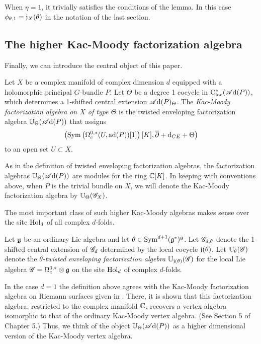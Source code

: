 When $\eta = 1$, it trivially satisfies the conditions of the lemma. 
In this case $\phi_{\theta, 1} = \mathfrak j_X(\theta)$ in the notation of the last section. 


\subsection{The higher Kac-Moody factorization algebra}

Finally, we can introduce the central object of this paper.

\begin{dfn}
Let $X$ be a complex manifold of complex dimension $d$ equipped with a holomorphic principal $G$-bundle $P$.
Let $\Theta$ be a degree 1 cocycle in ${\rm C}_{\rm loc}^*(\mathscr A{\rm d}(P))$, 
which determines a 1-shifted central extension $\mathscr A{\rm d}(P)_\Theta$.
The {\em Kac-Moody factorization algebra on $X$ of type $\Theta$} is the twisted enveloping factorization algebra $\mathbb U_\Theta (\mathscr A{\rm d}(P))$ that assigns
\[
\left({\rm Sym}\left(\Omega^{0,*}_c(U, {\rm ad}(P))[1]\right) [K] , \overline{\partial} + {\rm d}_{CE} + \Theta\right) 
\]
to an open set $U \subset X$.
\end{dfn}

\begin{rmk} 
As in the definition of twisted enveloping factorization algebras, the factorization algebras $\mathbb U_\Theta(\mathscr A{\rm d}(P))$ are modules for the ring $\mathbb C[K]$. 
In keeping with conventions above, when $P$ is the trivial bundle on $X$, 
we will denote the Kac-Moody factorization algebra by $\mathbb U_\Theta(\mathscr G_X)$. 
\end{rmk}

The most important class of such higher Kac-Moody algebras makes sense over the site ${\rm Hol}_d$ of all complex $d$-folds.

\begin{dfn}
Let $\mathfrak g$ be an ordinary Lie algebra and let $\theta \in {\rm Sym}^{d+1}(\mathfrak g^*)^\mathfrak g$.  
Let $\mathscr G_{d,\theta}$ denote the 1-shifted central extension of $\mathscr G_d$ determined by the local cocycle $\mathfrak j(\theta)$.
Let $\mathbb U_\theta (\mathscr G)$ denote the {\em $\theta$-twisted enveloping factorization algebra} $\mathbb U_{\mathfrak j(\theta)} (\mathscr G)$ for the local Lie algebra $\mathscr G = \Omega^{0,*}_c \otimes \mathfrak g$ on the site ${\rm Hol}_d$ of complex $d$-folds.
\end{dfn}

In the case $d = 1$ the definition above agrees with the Kac-Moody factorization algebra on Riemann surfaces given in \cite{CG1}.
There, it is shown that this factorization algebra, restricted to the complex manifold $\mathbb C$, recovers a vertex algebra isomorphic to that of the ordinary Kac-Moody vertex algebra.
(See Section 5 of Chapter 5.)
Thus, we think of the object $\mathbb U_\Theta(\mathscr A{\rm d}(P))$ as a higher dimensional version of the Kac-Moody vertex algebra.


